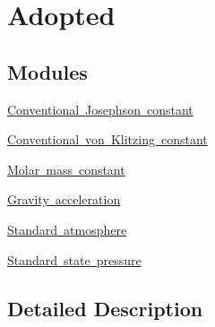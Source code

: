\hypertarget{group___n_i_s_t_const-_adopted}{}\section{Adopted}
\label{group___n_i_s_t_const-_adopted}
\subsection*{Modules}
\begin{DoxyCompactItemize}
\item 
\mbox{\hyperlink{group___n_i_s_t_const-_conventional_josephson_constant}{Conventional Josephson constant}}
\item 
\mbox{\hyperlink{group___n_i_s_t_const-_conventionalvon_klitzing_constant}{Conventional von Klitzing constant}}
\item 
\mbox{\hyperlink{group___n_i_s_t_const-_molar_mass_constant}{Molar mass constant}}
\item 
\mbox{\hyperlink{group___n_i_s_t_const-_gravity_acceleration}{Gravity acceleration}}
\item 
\mbox{\hyperlink{group___n_i_s_t_const-_standard_atmosphere}{Standard atmosphere}}
\item 
\mbox{\hyperlink{group___n_i_s_t_const-_standard_state_pressure}{Standard state pressure}}
\end{DoxyCompactItemize}


\subsection{Detailed Description}
